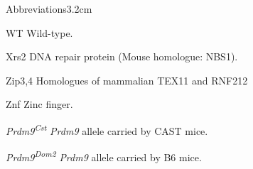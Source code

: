 \begin{mclistof}{Abbreviations}{3.2cm}
\item[WT] Wild-type.
\item[Xrs2] DNA repair protein (Mouse homologue: NBS1).
\item[Zip3,4] Homologues of mammalian TEX11 and RNF212
\item[Znf] Zinc finger.
\item[\textit{Prdm9\textsuperscript{Cst}}] \textit{Prdm9} allele carried by CAST mice.
\item[\textit{Prdm9\textsuperscript{Dom2}}] \textit{Prdm9} allele carried by B6 mice.






\end{mclistof}








